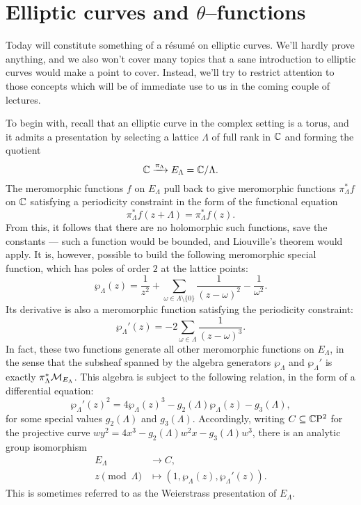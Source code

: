 \section{Elliptic curves and $\theta$--functions}


Today will constitute something of a r\'esum\'e on elliptic curves.  We'll hardly prove anything, and we also won't cover many topics that a sane introduction to elliptic curves would make a point to cover.  Instead, we'll try to restrict attention to those concepts which will be of immediate use to us in the coming couple of lectures.

To begin with, recall that an elliptic curve in the complex setting is a torus, and it admits a presentation by selecting a lattice $\Lambda$ of full rank in $\mathbb{C}$ and forming the quotient \[\mathbb{C} \xrightarrow{\pi_\Lambda} E_\Lambda = \mathbb{C} / \Lambda.\]  The meromorphic functions $f$ on $E_\Lambda$ pull back to give meromorphic functions $\pi_\Lambda^* f$ on $\mathbb{C}$ satisfying a periodicity constraint in the form of the functional equation \[\pi_\Lambda^* f(z + \Lambda) = \pi_\Lambda^* f(z).\]  From this, it follows that there are no holomorphic such functions, save the constants --- such a function would be bounded, and Liouville's theorem would apply.  It is, however, possible to build the following meromorphic special function, which has poles of order $2$ at the lattice points: \[\wp_\Lambda(z) = \frac{1}{z^2} + \sum_{\omega \in \Lambda \setminus \{0\}} \frac{1}{(z - \omega)^2} - \frac{1}{\omega^2}.\]  Its derivative is also a meromorphic function satisfying the periodicity constraint: \[\wp_\Lambda'(z) = -2 \sum_{\omega \in \Lambda} \frac{1}{(z - \omega)^3}.\]  In fact, these two functions generate all other meromorphic functions on $E_\Lambda$, in the sense that the subsheaf spanned by the algebra generators $\wp_\Lambda$ and $\wp_\Lambda'$ is exactly $\pi_\Lambda^* \mathcal{M}_{E_\Lambda}$.  This algebra is subject to the following relation, in the form of a differential equation: \[\wp_\Lambda'(z)^2 = 4 \wp_\Lambda(z)^3 - g_2(\Lambda) \wp_\Lambda(z) - g_3(\Lambda),\] for some special values $g_2(\Lambda)$ and $g_3(\Lambda)$.  Accordingly, writing $C \subseteq \mathbb{C}\mathrm P^2$ for the projective curve $wy^2 = 4x^3 - g_2(\Lambda) w^2 x - g_3(\Lambda) w^3$, there is an analytic group isomorphism
\begin{align*}
E_\Lambda & \to C, \\
z \pmod \Lambda & \mapsto (1, \wp_\Lambda(z), \wp_\Lambda'(z)).
\end{align*}
This is sometimes referred to as the Weierstrass presentation of $E_\Lambda$.

